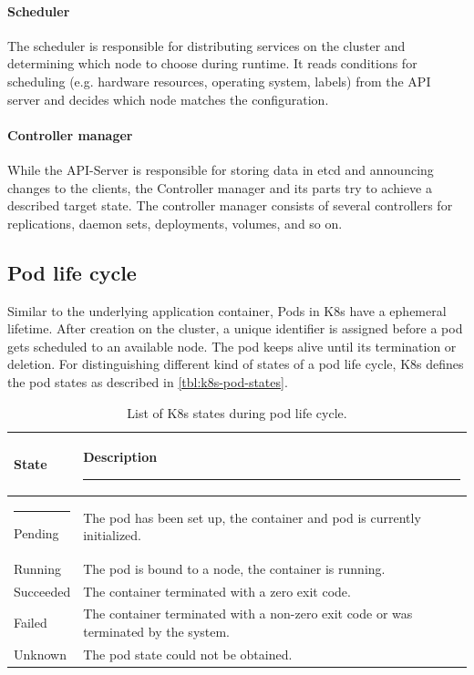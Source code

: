 \paragraph*{Scheduler} The scheduler is responsible for distributing services on the cluster and determining which node to choose during runtime. It reads conditions for scheduling (e.g. hardware resources, operating system, labels) from the \ac{API} server and decides which node matches the configuration\cite{Luksa.2018}.

\paragraph*{Controller manager} While the \ac{API}-Server is responsible for storing data in etcd and announcing changes to the clients, the Controller manager and its parts try to achieve a described target state\cite{Luksa.2018}. The controller manager consists of several controllers for replications, daemon sets, deployments, volumes, and so on.


\subsection{Pod life cycle}
\label{chap:design.life_cycle}
Similar to the underlying application container, Pods in \ac{K8s} have a ephemeral lifetime\cite{Kubernetes.20230217}. After creation on the cluster, a unique identifier is assigned before a pod gets scheduled to an available node\cite{Kubernetes.20230217}. The pod keeps alive until its termination or deletion\cite{Kubernetes.20230217}.
For distinguishing different kind of states of a pod life cycle, \ac{K8s} defines the pod states as described in \autoref{tbl:k8s-pod-states}.

\begin{table}[h!]
	\centering
	\begin{tabular}{|l | p{}|} 
		\hline
		\bfseries State & \bfseries Description  \rule{-5pt}{2.6ex} \\
		\hline \rule{-3pt}{3ex}
		Pending & The pod has been set up, the container and pod is currently initialized. \\
		\hline
		Running & The pod is bound to a node, the container is running. \\
		\hline
		Succeeded & The container terminated with a zero exit code. \\ 
		\hline
		Failed & The container terminated with a non-zero exit code or was terminated by the system. \\ 
		\hline
		Unknown & The pod state could not be obtained. \\ 
		[1ex] 
		\hline
	\end{tabular}
	\caption{List of \ac{K8s} states during pod life cycle\cite{Kubernetes.20230217}.}
	\label{tbl:k8s-pod-states}
\end{table}

